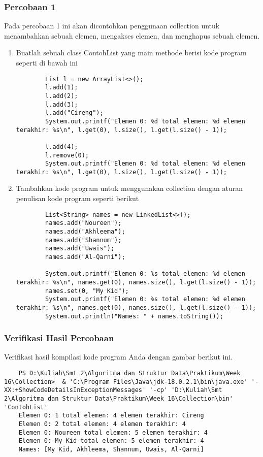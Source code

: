 \documentclass[12pt,titlepage]{article}
\begin{document}
\subsubsection{Percobaan 1}
Pada percobaan 1 ini akan dicontohkan penggunaan collection untuk menambahkan sebuah elemen, mengakses elemen, dan menghapus sebuah elemen.
\begin{enumerate}
    \item Buatlah sebuah class ContohList yang main methode berisi kode program seperti di bawah ini
    \begin{verbatim}
        List l = new ArrayList<>();
        l.add(1);
        l.add(2);
        l.add(3);
        l.add("Cireng");
        System.out.printf("Elemen 0: %d total elemen: %d elemen terakhir: %s\n", l.get(0), l.size(), l.get(l.size() - 1));
        
        l.add(4);
        l.remove(0);
        System.out.printf("Elemen 0: %d total elemen: %d elemen terakhir: %s\n", l.get(0), l.size(), l.get(l.size() - 1));
    \end{verbatim}
    \item Tambahkan kode program untuk menggunakan collection dengan aturan penulisan kode program seperti berikut
    \begin{verbatim}
        List<String> names = new LinkedList<>();
        names.add("Noureen");
        names.add("Akhleema");
        names.add("Shannum");
        names.add("Uwais");
        names.add("Al-Qarni");
        
        System.out.printf("Elemen 0: %s total elemen: %d elemen terakhir: %s\n", names.get(0), names.size(), l.get(l.size() - 1));
        names.set(0, "My Kid");
        System.out.printf("Elemen 0: %s total elemen: %d elemen terakhir: %s\n", names.get(0), names.size(), l.get(l.size() - 1));
        System.out.println("Names: " + names.toString());
    \end{verbatim}
\end{enumerate}

\subsubsection{Verifikasi Hasil Percobaan}
Verifikasi hasil kompilasi kode program Anda dengan gambar berikut ini.
\begin{verbatim}
    PS D:\Kuliah\Smt 2\Algoritma dan Struktur Data\Praktikum\Week 16\Collection>  & 'C:\Program Files\Java\jdk-18.0.2.1\bin\java.exe' '-XX:+ShowCodeDetailsInExceptionMessages' '-cp' 'D:\Kuliah\Smt 2\Algoritma dan Struktur Data\Praktikum\Week 16\Collection\bin' 'ContohList'
    Elemen 0: 1 total elemen: 4 elemen terakhir: Cireng 
    Elemen 0: 2 total elemen: 4 elemen terakhir: 4      
    Elemen 0: Noureen total elemen: 5 elemen terakhir: 4
    Elemen 0: My Kid total elemen: 5 elemen terakhir: 4 
    Names: [My Kid, Akhleema, Shannum, Uwais, Al-Qarni]
\end{verbatim}
\end{document}
